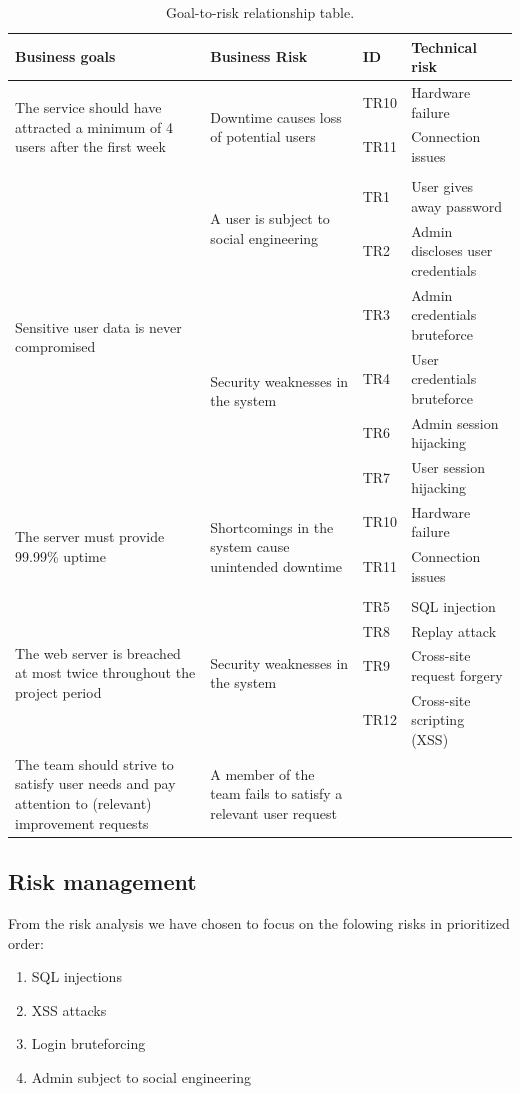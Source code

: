 \documentclass[a4paper]{article}
\begin{document}
\begin{table}
	\begin{tabular}{| p{4cm} | p{4cm}| l | l |}
    \hline
   	\textbf{Business goals} & \textbf{Business Risk} & \textbf{ID}  & \textbf{Technical risk} \\ \hline
    \multirow{3}{4cm}{The service should have attracted a minimum of 4 users after the first week} & \multirow{3}{4cm}{Downtime causes loss of potential users} & TR10 & Hardware failure \\ & & TR11 & Connection issues \\ & & & \\ \hline
    \multirow{6}{4cm}{Sensitive user data is never compromised} & \multirow{2}{4cm}{A user is subject to social engineering} & TR1 & User gives away password \\ & & TR2 & Admin discloses user credentials \\ & \multirow{4}{4cm}{Security weaknesses in the system} & TR3 & Admin credentials bruteforce \\ & & TR4 & User credentials bruteforce \\ & & TR6 & Admin session hijacking \\ & & TR7 & User session hijacking \\ \hline
    \multirow{3}{4cm}{The server must provide 99.99\% uptime} & \multirow{3}{4cm}{Shortcomings in the system cause unintended downtime} & TR10 & Hardware failure \\ & & TR11 & Connection issues \\ & & & \\ \hline
    \multirow{4}{4cm}{The web server is breached at most twice throughout the project period} & \multirow{4}{4cm}{Security weaknesses in the system} & TR5 & SQL injection \\ & & TR8 & Replay attack \\ & & TR9 & Cross-site request forgery \\ & & TR12 & Cross-site scripting (XSS) \\ \hline
    The team should strive to satisfy user needs and pay attention to (relevant) improvement requests & A member of the team fails to satisfy a relevant user request & & \\ \hline
    \end{tabular}
    \caption{Goal-to-risk relationship table.}
	\label{tab:goal_to_risk_relationship}
\end{table}

\subsection{Risk management}
From the risk analysis we have chosen to focus on the folowing risks in prioritized order:
\begin{enumerate}
\item{SQL injections}
\item{XSS attacks}
\item{Login bruteforcing}
\item{Admin subject to social engineering}
\end{enumerate}
\end{document}
